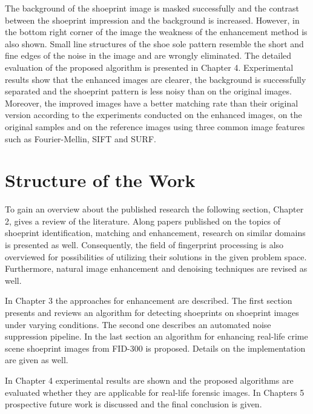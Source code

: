 \documentclass[draft,final]{vutinfth} %
\begin{document}
The background of the shoeprint image is masked successfully and the contrast between the shoeprint impression and the background is increased.
However, in the bottom right corner of the image the weakness of the enhancement method is also shown.
Small line structures of the shoe sole pattern resemble the short and fine edges of the noise in the image and are wrongly eliminated.
The detailed evaluation of the proposed algorithm is presented in Chapter 4.
Experimental results show that the enhanced images are clearer, the background is successfully separated and the shoeprint pattern is less noisy than on the original images.
Moreover, the improved images have a better matching rate than their original version according to the experiments conducted on the enhanced images, on the original samples and on the reference images using three common image features such as Fourier-Mellin, SIFT and SURF.

\section{Structure of the Work}
\par
To gain an overview about the published research the following section, Chapter 2, gives a review of the literature. 
Along papers published on the topics of shoeprint identification, matching and enhancement, research on similar domains is presented as well.
Consequently, the field of fingerprint processing is also overviewed for possibilities of utilizing their solutions in the given problem space.
Furthermore, natural image enhancement and denoising techniques are revised as well.
\par
In Chapter 3 the approaches for enhancement are described.
The first section presents and reviews an algorithm for detecting shoeprints on shoeprint images under varying conditions.
The second one describes an automated noise suppression pipeline.
In the last section an algorithm for enhancing real-life crime scene shoeprint images from FID-300 is proposed.
Details on the implementation are given as well.
\par
In Chapter 4 experimental results are shown and the proposed algorithms are evaluated whether they are applicable for real-life forensic images.
In Chapters 5 prospective future work is discussed and the final conclusion is given. 
\end{document}

